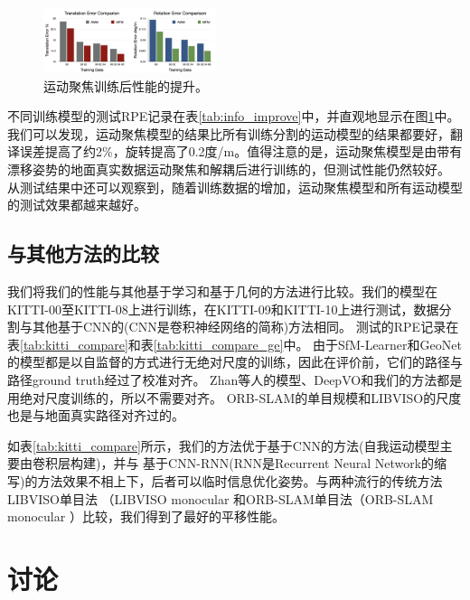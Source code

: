 \begin{figure}[ht]
    \centering
    \includegraphics[width=0.45\textwidth]{datavo/focusing_train.png}
    \caption{运动聚焦训练后性能的提升。}
    \label{fig:focucing_train}
\end{figure}


不同训练模型的测试RPE记录在表\ref{tab:info_improve}中，并直观地显示在图\ref{fig:focucing_train}中。我们可以发现，运动聚焦模型的结果比所有训练分割的运动模型的结果都要好，翻译误差提高了约2\%，旋转提高了0.2度/m。值得注意的是，运动聚焦模型是由带有漂移姿势的地面真实数据{运动聚焦和解耦后}进行训练的，但测试性能仍然较好。
从测试结果中还可以观察到，随着训练数据的增加，运动聚焦模型和所有运动模型的测试效果都越来越好。
\subsection{与其他方法的比较}
\label{sec:compare}

我们将我们的性能与其他基于学习和{基于几何的}方法进行比较。我们的模型在KITTI-00至KITTI-08上进行训练，在KITTI-09和KITTI-10上进行测试，数据分割与其他基于CNN的{(CNN是卷积神经网络的简称)}方法相同\cite{zhan2018unsupervised,zhou2017unsupervised,yin2018geonet}。
测试的RPE记录在表\ref{tab:kitti_compare}和表\ref{tab:kitti_compare_ge}中。
由于SfM-Learner\cite{zhou2017unsupervised}和GeoNet\cite{yin2018geonet}的模型都是以自监督的方式进行无绝对尺度的训练，因此在评价前，它们的路径与路径ground truth经过了校准对齐。
Zhan等人的模型\cite{zhan2018unsupervised}、DeepVO\cite{wang2017deepvo}和我们的方法都是用绝对尺度训练的，所以不需要对齐。
ORB-SLAM的单目规模\cite{raul2015orb}和LIBVISO\cite{Geiger2011IV}的尺度也是与地面真实路径对齐过的。

如表\ref{tab:kitti_compare}所示，我们的方法优于基于CNN的方法(自我运动模型主要由卷积层构建)\cite{zhan2018unsupervised,zhou2017unsupervised,yin2018geonet}，并与
基于CNN-RNN{(RNN是Recurrent Neural Network的缩写)}的方法\cite{wang2017deepvo}效果不相上下，后者可以临时信息优化姿势。与两种流行的传统方法LIBVISO单目法
（LIBVISO monocular \cite{Geiger2011IV}和ORB-SLAM单目法（ORB-SLAM monocular \cite{raul2015orb}）比较，我们得到了最好的平移性能。


\section{讨论}

